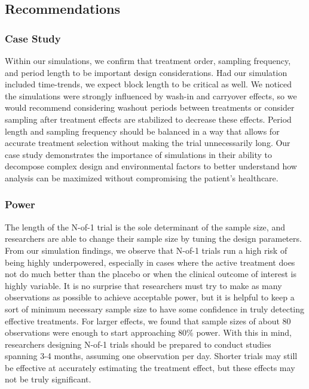 \documentclass[11pt,]{article}
\begin{document}
\subsection{Recommendations}\label{recommendations}

\subsubsection{Case Study}\label{case-study}

Within our simulations, we confirm that treatment order, sampling
frequency, and period length to be important design considerations. Had
our simulation included time-trends, we expect block length to be
critical as well. We noticed the simulations were strongly influenced by
wash-in and carryover effects, so we would recommend considering washout
periods between treatments or consider sampling after treatment effects
are stabilized to decrease these effects. Period length and sampling
frequency should be balanced in a way that allows for accurate treatment
selection without making the trial unnecessarily long. Our case study
demonstrates the importance of simulations in their ability to decompose
complex design and environmental factors to better understand how
analysis can be maximized without compromising the patient's healthcare.

\subsubsection{Power}\label{power}

The length of the N-of-1 trial is the sole determinant of the sample
size, and researchers are able to change their sample size by tuning the
design parameters. From our simulation findings, we observe that N-of-1
trials run a high risk of being highly underpowered, especially in cases
where the active treatment does not do much better than the placebo or
when the clinical outcome of interest is highly variable. It is no
surprise that researchers must try to make as many observations as
possible to achieve acceptable power, but it is helpful to keep a sort
of minimum necessary sample size to have some confidence in truly
detecting effective treatments. For larger effects, we found that sample
sizes of about 80 observations were enough to start approaching 80\%
power. With this in mind, researchers designing N-of-1 trials should be
prepared to conduct studies spanning 3-4 months, assuming one
observation per day. Shorter trials may still be effective at accurately
estimating the treatment effect, but these effects may not be truly
significant.
\end{document}
